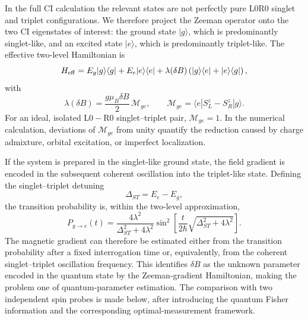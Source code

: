 \documentclass[fleqn,10pt]{wlscirep}
\begin{document}
In the full CI calculation the relevant states are not perfectly pure
$\mathrm{L0}\mathrm{R0}$ singlet and triplet configurations.  We therefore project
the Zeeman operator onto the two CI eigenstates of interest: the ground state
$|g\rangle$, which is predominantly singlet-like, and an excited state $|e\rangle$,
which is predominantly triplet-like.  The effective two-level Hamiltonian is
\begin{equation}
  H_{\rm eff}
  =
  E_g |g\rangle\langle g|
  +
  E_e |e\rangle\langle e|
  +
  \lambda(\delta B)
  \left(
  |g\rangle\langle e| + |e\rangle\langle g|
  \right),
  \label{eq:effective_ST_hamiltonian}
\end{equation}
with
\begin{equation}
  \lambda(\delta B)
  =
  \frac{g\mu_B\delta B}{2}
  \,
  \mathcal M_{ge},
  \qquad
  \mathcal M_{ge}
  =
  \langle e|
  S^z_L-S^z_R
  |g\rangle .
  \label{eq:gradient_matrix_element}
\end{equation}
For an ideal, isolated $\mathrm{L0}-\mathrm{R0}$ singlet--triplet pair,
$\mathcal M_{ge}=1$.  In the numerical calculation, deviations of
$\mathcal M_{ge}$ from unity quantify the reduction caused by charge admixture,
orbital excitation, or imperfect localization.

If the system is prepared in the singlet-like ground state, the field gradient is
encoded in the subsequent coherent oscillation into the triplet-like state.  Defining
the singlet--triplet detuning
\begin{equation}
  \Delta_{ST}=E_e-E_g ,
\end{equation}
the transition probability is, within the two-level approximation,
\begin{equation}
  P_{g\rightarrow e}(t)
  =
  \frac{4\lambda^2}
  {\Delta_{ST}^2+4\lambda^2}
  \sin^2
  \left[
  \frac{t}{2\hbar}
  \sqrt{\Delta_{ST}^2+4\lambda^2}
  \right].
  \label{eq:gradient_transition_probability}
\end{equation}
The magnetic gradient can therefore be estimated either from the transition
probability after a fixed interrogation time or, equivalently, from the coherent
singlet--triplet oscillation frequency.  This identifies $\delta B$ as the unknown
parameter encoded in the quantum state by the Zeeman-gradient Hamiltonian, making
the problem one of quantum-parameter estimation.  The
comparison with two independent spin probes is made below, after introducing the
quantum Fisher information and the corresponding optimal-measurement framework.
\end{document}
